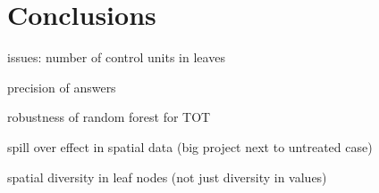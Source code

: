 \documentclass[runningheads,a4paper]{llncs}
\begin{document}






\section{Conclusions}
issues: number of control units in leaves

precision of answers

robustness of random forest for TOT

spill over effect in spatial data (big project next to untreated case)

spatial diversity in leaf nodes (not just diversity in values)


\end{document}

